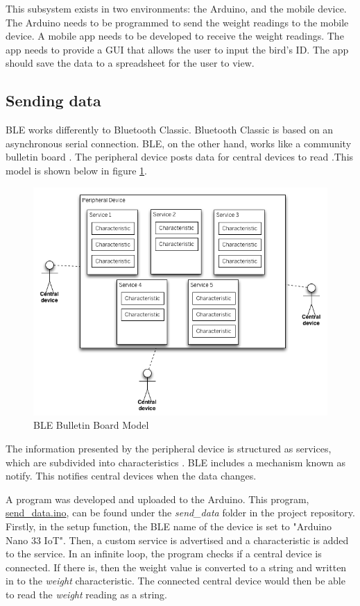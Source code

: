 \documentclass[class=report,11pt,crop=false]{standalone}
\begin{document}
		This subsystem exists in two environments: the Arduino, and the mobile device. The Arduino needs to be programmed to send the weight readings to the mobile device. A mobile app needs to be developed to receive the weight readings. The app needs to provide a GUI that allows the user to input the bird's ID. The app should save the data to a spreadsheet for the user to view.
		
	
		\subsection{Sending data}
		
		BLE works differently to Bluetooth Classic. Bluetooth Classic is based on an asynchronous serial connection. BLE, on the other hand, works like a community bulletin board \cite{ble}. The peripheral device posts data for central devices to read \cite{ble}.This model is shown below in figure \ref{fig:ble-bulletin-board-model}.
		
		\begin{figure}[h!]
			\centering
			\includegraphics[scale=0.5]{Figures/ble-bulletin-board-model}
			\caption{BLE Bulletin Board Model \cite{ble}}
			\label{fig:ble-bulletin-board-model}
		\end{figure}
		
		The information presented by the peripheral device is structured as services, which are subdivided into characteristics \cite{ble}. BLE includes a mechanism known as notify. This notifies central devices when the data changes.
		
		A program was developed and uploaded to the Arduino. This program, \href{https://github.com/karanimaan/EEE4113F-Project--Group-26/blob/main/send_data/send_data.ino}{send\_data.ino}, can be found under the \textit{send\_data} folder in the project repository.
		Firstly, in the setup function, the BLE name of the device is set to "Arduino Nano 33 IoT".
		Then, a custom service is advertised and a characteristic is added to the service.
		In an infinite loop, the program checks if a central device is connected. If there is, then the weight value is converted to a string and written in to the \textit{weight} characteristic. The connected central device would then be able to read the \textit{weight} reading as a string.
		
\end{document}
